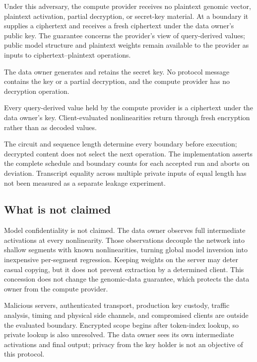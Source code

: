 Under this adversary, the compute provider receives no plaintext genomic vector, plaintext
activation, partial decryption, or secret-key material. At a boundary it supplies a ciphertext and
receives a fresh ciphertext under the data owner's public key. The guarantee concerns the
provider's view of query-derived values; public model structure and plaintext weights remain
available to the provider as inputs to ciphertext--plaintext operations.

\begin{invariant}
The data owner generates and retains the secret key. No protocol message contains the key or a
partial decryption, and the compute provider has no decryption operation.
\end{invariant}

\begin{invariant}
Every query-derived value held by the compute provider is a ciphertext under the data owner's key.
Client-evaluated nonlinearities return through fresh encryption rather than as decoded values.
\end{invariant}

\begin{invariant}
The circuit and sequence length determine every boundary before execution; decrypted content does
not select the next operation. The implementation asserts the complete schedule and boundary counts
for each accepted run and aborts on deviation. Transcript equality across multiple private inputs
of equal length has not been measured as a separate leakage experiment.
\end{invariant}

\subsection{What is not claimed}
Model confidentiality is not claimed. The data owner observes full intermediate activations at
every nonlinearity. Those observations decouple the network into shallow segments with known
nonlinearities, turning global model inversion into inexpensive per-segment regression. Keeping
weights on the server may deter casual copying, but it does not prevent extraction by a determined
client. This concession does not change the genomic-data guarantee, which protects the data owner
from the compute provider.

Malicious servers, authenticated transport, production key custody, traffic analysis, timing and
physical side channels, and compromised clients are outside the evaluated boundary. Encrypted
scope begins after token-index lookup, so private lookup is also unresolved. The data owner sees
its own intermediate activations and final output; privacy from the key holder is not an objective
of this protocol.
